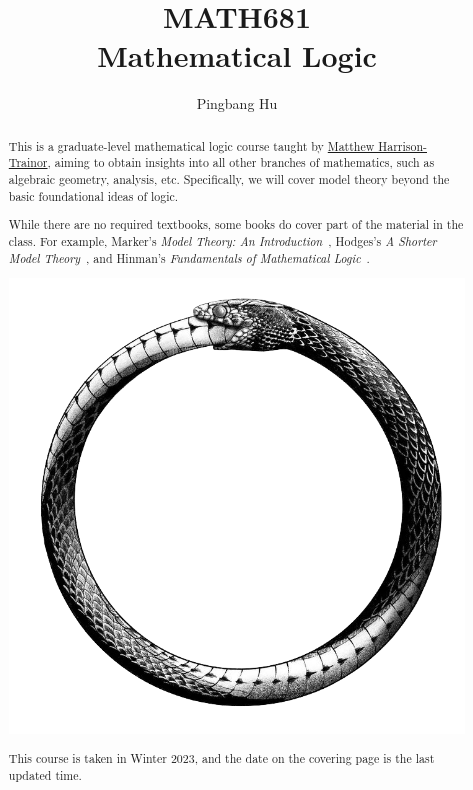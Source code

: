 \documentclass[a4paper]{report}
\author{Pingbang Hu}
\title{MATH681\\Mathematical Logic}
\begin{document}
\maketitle

\begin{abstract}
	This is a graduate-level mathematical logic course taught by \href{http://www-personal.umich.edu/~matthhar/}{Matthew Harrison-Trainor}, aiming to obtain insights into all other branches of mathematics, such as algebraic geometry, analysis, etc. Specifically, we will cover model theory beyond the basic foundational ideas of logic.

	While there are no required textbooks, some books do cover part of the material in the class. For example, Marker's \emph{Model Theory: An Introduction}~\cite{marker2002model}, Hodges's \emph{A Shorter Model Theory}~\cite{hodges1997shorter}, and Hinman's \emph{Fundamentals of Mathematical Logic}~\cite{hinman2005fundamentals}.

	\vfill
	\begin{center}
		\includegraphics[width=.8\linewidth]{Figures/cover.png}
	\end{center}
	\vfill
	This course is taken in Winter 2023, and the date on the covering page is the last updated time.
\end{abstract}

\tableofcontents


\newpage
\appendix
\appendixpage{}



\newpage
\printbibliography{}
\end{document}
